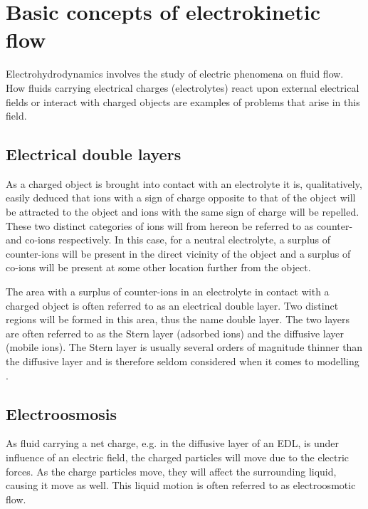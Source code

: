 \section{Basic concepts of electrokinetic flow}
Electrohydrodynamics involves the study of electric phenomena on fluid
flow. How fluids carrying electrical charges (electrolytes) react upon
external electrical fields or interact with charged objects are
examples of problems that arise in this field. 

\subsection{Electrical double layers}
As a charged object is brought into contact with an electrolyte it is,
qualitatively, easily deduced that ions with a sign of charge opposite
to that of the object will be attracted to the object and ions with
the same sign of charge will be repelled. These two distinct
categories of ions will from hereon be referred to as counter- and
co-ions respectively. In this case, for a neutral electrolyte, a
surplus of counter-ions will be present in the direct vicinity of the
object and a surplus of co-ions will be present at some other location
further from the object.
 
The area with a surplus of counter-ions in an electrolyte in contact
with a charged object is often referred to as an electrical double
layer. Two distinct regions will be formed in this area, thus the name 
double layer. The two layers are often referred to as the Stern
layer (adsorbed ions) and the diffusive layer (mobile ions). The Stern
layer is usually several orders of magnitude thinner than the
diffusive layer and is therefore seldom considered when it comes to
modelling \cite{dongquing-ren-book}. 

\subsection{Electroosmosis}
As fluid carrying a net charge, e.g. in the diffusive layer of an EDL,
is under influence of an electric field, the charged particles will
move due to the electric forces. As the charge particles move, they
will affect the surrounding liquid, causing it move as well. This
liquid motion is often referred to as electroosmotic
flow. \cite{dongquing-ren-book}


